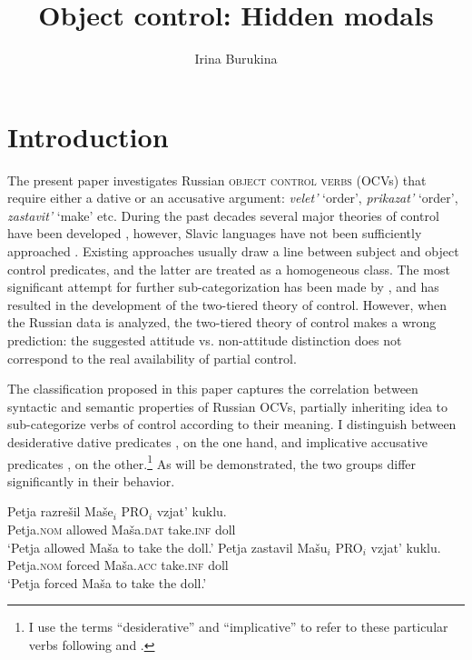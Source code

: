 \documentclass[output=paper,
colorlinks,
citecolor=brown,
newtxmath
]{langscibook}
\title{Object control: Hidden modals}
\author{Irina Burukina\affiliation{Eötvös Loránd University}
}
\begin{document}
\maketitle

\section{Introduction}\label{s1}

\sloppy The present paper investigates Russian \textsc{object control verbs} (OCVs) that require either a dative or an accusative argument: \textit{velet’} `order’, \textit{prikazat’} `order’, \textit{zastavit’} `make’ etc.  During the past decades several major theories of control have been developed \citep{W2001, Boeckx2010, Landau2015}, however, Slavic languages have not been sufficiently approached \citep{FranksHornstein1992, Babby1998}. Existing approaches usually draw a line between subject and object control predicates, and the latter are treated as a homogeneous class. The most significant attempt for further sub-categorization has been made by \cite{Landau2015}, and has resulted in the development of the two-tiered theory of control. However, when the Russian data is analyzed, the two-tiered theory of control makes a wrong prediction: the suggested attitude vs. non-attitude distinction does not correspond to the real availability of partial control. \par

The classification proposed in this paper captures the correlation between syntactic and semantic properties of Russian OCVs, partially inheriting \cite{JC2003} idea to sub-categorize verbs of control according to their meaning. I distinguish between desiderative dative predicates , on the one hand, and implicative accusative predicates , on the other.\footnote{I use the terms ``desiderative'' and ``implicative'' to refer to these particular verbs following \cite{W2001} and \cite{Landau2013}.} As will be demonstrated, the two groups differ significantly in their behavior.

\begin{exe}
\ex\label{ex1} \begin{xlist}
\ex\label{ex1a} 
\gll Petja razrešil Maše$_i$ PRO$_i$ vzjat’ kuklu.\\ 
    Petja.\textsc{nom} allowed Maša.\textsc{dat} {} take.\textsc{inf} doll \\
\glt `Petja allowed Maša to take the doll.'
\ex\label{ex1b} 
\gll Petja zastavil Mašu$_i$ PRO$_i$ vzjat’ kuklu.\\ 
    Petja.\textsc{nom} forced Maša.\textsc{acc} {} take.\textsc{inf} doll \\
\glt `Petja forced Maša to take the doll.'
    \end{xlist}
\end{exe}
\end{document}
